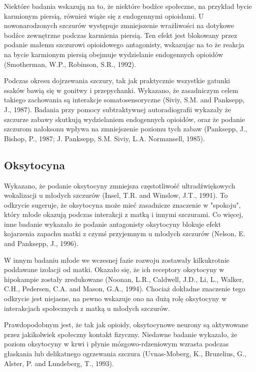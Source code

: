\documentclass[12pt]{article}
\begin{document}
Niektóre badania wskazują na to, że niektóre bodźce społeczne, na przykład bycie karmionym piersią, również wiąże się z endogennymi opioidami. U nowonarodzonych szczurów występuje zmniejszenie wrażliwości na dotykowe bodźce zewnętrzne podczas karmienia piersią. Ten efekt jest blokowany przez podanie małemu szczurowi opioidowego antagonisty, wskazując na to że reakcja na bycie karmionym piersią obejmuje wydzielanie endogennych opioidów (Smotherman, W.P., Robinson, S.R., 1992).

Podczas okresu dojrzewania szczury, tak jak praktycznie wszystkie gatunki ssaków bawią się w gonitwy i przepychanki. Wykazano, że zasadniczym celem takiego zachowania są interakcje somatosensoryczne (Siviy, S.M. and Panksepp, J., 1987). Badania przy pomocy subtraktywnej autoradiografii wykazały że szczurze zabawy skutkują wydzielaniem endogennych opioidów, oraz że podanie szczurom naloksonu wpływa na zmniejszenie poziomu tych zabaw (Panksepp, J., Bishop, P., 1987; J. Panksepp, S.M. Siviy, L.A. Normansell, 1985).

\subsection{Oksytocyna}

Wykazano, że podanie oksytocyny zmniejsza częstotliwość ultradźwiękowych wokalizacji u młodych szczurów (Insel, T.R. and Winslow, J.T., 1991). To odkrycie sugeruje, że oksytocyna może mieć zasadnicze znaczenie w "spokoju", który młode okazują podczas interakcji z matką i innymi szczurami. Co więcej, inne badanie wykazało że podanie antagonisty oksytocyny blokuje efekt kojarzenia zapachu matki z czymś przyjemnym u młodych szczurów (Nelson, E. and Panksepp, J., 1996).

W innym badaniu młode we wczesnej fazie rozwoju zostawały kilkukrotnie poddawane izolacji od matki. Okazało się, że ich receptory oksytocyny w hipokampie zostały zredukowane (Noonan, L.R., Caldwell, J.D., Li, L., Walker, C.H., Pedersen, C.A. and Mason, G.A., 1994). Chociaż dokładne znaczenie tego odkrycie jest niejasne, na pewno wskazuje ono na dużą rolę oksytocyny w interakcjach społecznych z matką u młodych szczurów.

\pagebreak

Prawdopodobnym jest, że tak jak opioidy, oksytocynowe neurony są aktywowane przez jakikolwiek społeczny kontakt fizyczny. Niedawne badanie wykazało, że poziom oksytocyny w krwi i płynie mózgowo-rdzeniowym wzrasta podczas głaskania lub delikatnego ogrzewania szczura (Uvnas-Moberg, K., Bruzelius, G., Alster, P. and Lundeberg, T., 1993).
\end{document}
